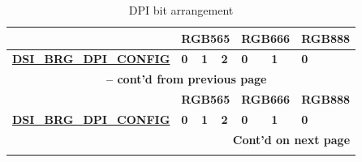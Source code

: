 \documentclass[main\_\_EN.tex]{subfiles}
\begin{document}
\scriptsize
\begin{longtable}[c]{ |p{2.5cm}|p{1cm}|p{1cm}|p{1cm}|p{1cm}|p{1cm}|p{1cm}| }
    \caption{DPI bit arrangement}
    \label{tab:dpi-bit-arrangement}\\\hline

    \rowcolor{lightgray}
    \textbf{} & \multicolumn{3}{|c|}{\textbf{RGB565}} & \multicolumn{2}{|c|}{\textbf{RGB666}} & \textbf{RGB888}  \\\hline
    \rowcolor{lightgray}
    \textbf{\hyperref[fielddesc:DSIBRGDPICONFIG]{DSI\_BRG\_DPI\_CONFIG}} & \textbf{0} & \textbf{1} & \textbf{2} & \textbf{0} & \textbf{1} & \textbf{0}  \\\hline
    \endfirsthead


    \multicolumn{7}{c}{\bfseries \tablename\ \thetable{} -- cont'd from previous page}\\\hline
    \rowcolor{lightgray}
    \textbf{} & \multicolumn{3}{|c|}{\textbf{RGB565}} & \multicolumn{2}{|c|}{\textbf{RGB666}} & \textbf{RGB888}  \\\hline
    \rowcolor{lightgray}
    \textbf{\hyperref[fielddesc:DSIBRGDPICONFIG]{DSI\_BRG\_DPI\_CONFIG}} & \textbf{0} & \textbf{1} & \textbf{2} & \textbf{0} & \textbf{1} & \textbf{0} \\\hline
    \endhead

    \multicolumn{7}{r}{\textbf{Cont'd on next page}} \\
    \endfoot

    \endlastfoot
        

\end{longtable}
\end{document}
